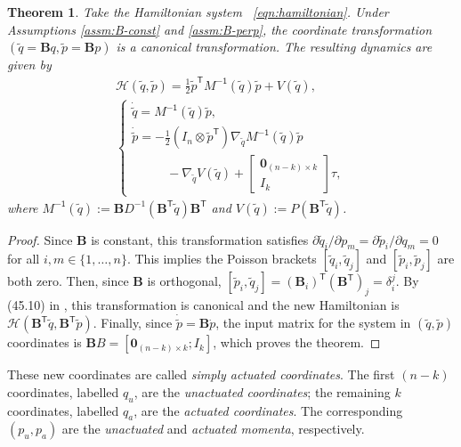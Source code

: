 \documentclass[journal,twoside,web]{ieeecolor}
\newtheorem{thm}{Theorem}%
\newcommand*{\tpose}{^\mathsf{T}}
\newcommand*{\Minv}{M^\mathsf{-1}}
\newcommand*{\Id}[1]{I_{#1}}
\newcommand*{\Zmat}[1]{\bm{0}_{#1}}
\newcommand*{\simpleB}{\begin{bmatrix}\Zmat{(n-k)\times k}\\ \Id{k}\end{bmatrix}}
\begin{document}
\begin{thm}\label{thm:simply-actuated}
    Take the Hamiltonian system ~\eqref{eqn:hamiltonian}.
    Under Assumptions \ref{assm:B-const} and \ref{assm:B-perp},
    the coordinate transformation
    \(\left(\tilde{q} = \mathbf{B}q, \tilde{p} = \mathbf{B}p\right)\)
    is a canonical transformation.
    The resulting dynamics are given by 
    \begin{gather}\label{eqn:simple-hamiltonian}
        \mathcal{H}(\tilde{q},\tilde{p}) = 
        \frac{1}{2} \tilde{p}\tpose \Minv(\tilde{q}) \tilde{p} + V(\tilde{q})
        , \\
       \begin{cases}
           \dot{\tilde{q}} = \Minv(\tilde{q})\tilde{p}
           , \\
           \dot{\tilde{p}} = -\frac{1}{2} (\Id{n} \otimes \tilde{p}\tpose)
           \nabla_{\tilde{q}} \Minv(\tilde{q}) \tilde{p} \\
           \phantom{---} - \nabla_{\tilde{q}} V(\tilde{q}) + \simpleB \tau
            ,
        \end{cases} \nonumber
    \end{gather}
    where 
    \(\Minv(\tilde{q}) := 
    \mathbf{B}D^{-1}(\mathbf{B}\tpose \tilde{q})\mathbf{B}\tpose\)
    and
    \(V(\tilde{q}) := P(\mathbf{B}\tpose \tilde{q})\).
\end{thm}
\begin{proof}
    Since \(\mathbf{B}\) is constant, this transformation satisfies
    \(\partial\tilde{q}_i/\partial p_m = \partial\tilde{p}_i/\partial q_m = 0\) for all 
    \(i,m \in \{1,\ldots,n\}\).
    This implies the Poisson brackets \([\tilde{q}_i, \tilde{q}_j]\)
    and \([\tilde{p}_i,\tilde{p}_j]\) are both zero.
    Then, since \(\mathbf{B}\) is orthogonal, 
    \([\tilde{p}_i, \tilde{q}_j] = (\mathbf{B}_i)\tpose (\mathbf{B}\tpose)_j
        = \delta_i^j\).
    By (45.10) in \cite{landau_mechanics}, this transformation is canonical and
    the new Hamiltonian is
    \(\mathcal{H}(\mathbf{B}\tpose \tilde{q}, \mathbf{B}\tpose \tilde{p})\).
    Finally, since \(\dot{\tilde{p}} = \mathbf{B} \dot{p}\), the input
    matrix for the system in \((\tilde{q},\tilde{p})\) coordinates is
    \(\mathbf{B}B = [\Zmat{(n-k)\times k}; \Id{k}]\), which proves the theorem.
\end{proof}

These new coordinates are called 
\textit{simply actuated coordinates}.
The first \((n-k)\) coordinates, labelled \(q_u\), are
the \textit{unactuated coordinates}; 
the remaining \(k\) coordinates, labelled \(q_a\), are the
\textit{actuated coordinates}.
The corresponding \((p_u, p_a)\) are the \textit{unactuated} and 
\textit{actuated momenta}, respectively.
\end{document}
